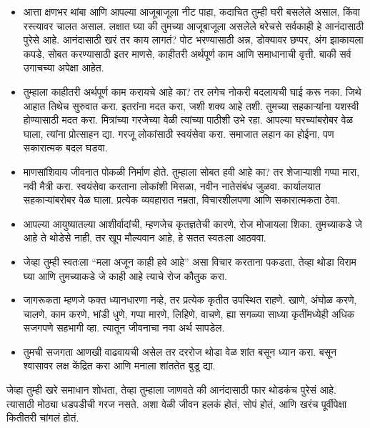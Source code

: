 \begin{itemize}
 \item आत्ता क्षणभर थांबा आणि आपल्या आजूबाजूला नीट पाहा, कदाचित तुम्ही घरी बसलेले असाल,
 किंवा रस्त्यावर चालत असाल.
 लक्षात घ्या की तुमच्या आजूबाजूला असलेले बरेचसे सर्वकाही हे आनंदासाठी पुरेसे आहे.
 आनंदासाठी खरं तर काय लागतं? पोट भरण्यासाठी अन्न, डोक्यावर छप्पर, अंग झाकायला कपडे, सोबत करण्यासाठी इतर माणसे, काहीतरी अर्थपूर्ण काम आणि समाधानाची वृत्ती.
 बाकी सर्व उगाचच्या अपेक्षा आहेत.
\item तुम्हाला काहीतरी अर्थपूर्ण काम करायचे आहे का? तर लगेच नोकरी बदलायची घाई करू नका.
 जिथे आहात तिथेच सुरुवात करा.
 इतरांना मदत करा, जशी शक्य आहे तशी.
 तुमच्या सहकाऱ्यांना यशस्वी होण्यासाठी मदत करा.
 मित्रांच्या गरजेच्या वेळी त्यांच्या पाठीशी उभे रहा.
 आपल्या घरच्यांबरोबर वेळ घाला, त्यांना प्रोत्साहन द्या.
 गरजू लोकांसाठी स्वयंसेवा करा.
 समाजात लहान का होईना, पण सकारात्मक बदल घडवा.
\item माणसांशिवाय जीवनात पोकळी निर्माण होते.
 तुम्हाला सोबत हवी आहे का? तर शेजाऱ्याशी गप्पा मारा, नवी मैत्री करा.
 स्वयंसेवा करताना लोकांशी मिसळा, नवीन नातेसंबंध जुळवा.
 कार्यालयात सहकाऱ्यांबरोबर वेळ घाला.
 प्रत्येक व्यवहारात नम्रता, विचारशीलपणा आणि सकारात्मकता ठेवा.
\item आपल्या आयुष्यातल्या आशीर्वादांची, म्हणजेच कृतज्ञतेची कारणे, रोज मोजायला शिका.
 तुमच्याकडे जे आहे ते थोडेसे नाही, तर खूप मौल्यवान आहे, हे सतत स्वतःला आठववा.
\item जेव्हा तुम्ही स्वतःला ``मला अजून काही हवे आहे'' असा विचार करताना पकडता,
 तेव्हा थोडा विराम घ्या आणि तुमच्याकडे जे काही आहे त्याचे रोज कौतुक करा.
\item जागरूकता म्हणजे फक्त ध्यानधारणा नव्हे, तर प्रत्येक कृतीत उपस्थित राहणे.
 खाणे, अंघोळ करणे, चालणे, काम करणे, भांडी धुणे, गप्पा मारणे, लिहिणे, वाचणे, 
 ह्या सगळ्या साध्या कृतींमध्येही अधिक सजगपणे सहभागी व्हा.
 त्यातून जीवनाचा नवा अर्थ सापडेल.
\item तुमची सजगता आणखी वाढवायची असेल तर दररोज थोडा वेळ शांत बसून ध्यान करा.
 बसून श्वासावर लक्ष केंद्रित करा आणि मनाला शांततेत बुडू द्या.
 \end{itemize}
जेव्हा तुम्ही खरे समाधान शोधता, तेव्हा तुम्हाला जाणवते की आनंदासाठी फार थोडकंच पुरेसं आहे.
 त्यासाठी मोठ्या धडपडीची गरज नसते.
 अशा वेळी जीवन हलकं होतं, सोपं होतं, आणि खरंच पूर्वीपेक्षा कितीतरी चांगलं होतं.

